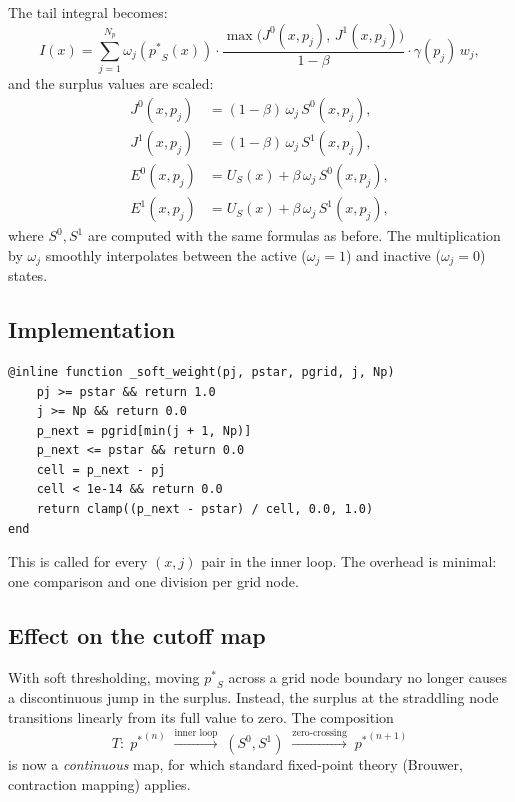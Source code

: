 \documentclass[11pt,a4paper]{article}
\newcommand{\pstar}{\mathord{p^{*}}}
\theoremstyle{definition}
\begin{document}
The tail integral becomes:
\begin{equation}
    I(x) = \sum_{j=1}^{N_p} \omega_j(\pstar_S(x)) \cdot
            \frac{\max\bigl(J^0(x,p_j),\, J^1(x,p_j)\bigr)}{1-\beta}
            \cdot \gamma(p_j)\, w_j,
\end{equation}
and the surplus values are scaled:
\begin{align}
    J^0(x, p_j) &= (1-\beta)\, \omega_j\, S^0(x, p_j), \\
    J^1(x, p_j) &= (1-\beta)\, \omega_j\, S^1(x, p_j), \\
    E^0(x, p_j) &= U_S(x) + \beta\, \omega_j\, S^0(x, p_j), \\
    E^1(x, p_j) &= U_S(x) + \beta\, \omega_j\, S^1(x, p_j),
\end{align}
where $S^0, S^1$ are computed with the same formulas as before.  The
multiplication by $\omega_j$ smoothly interpolates between the active
($\omega_j = 1$) and inactive ($\omega_j = 0$) states.

\subsection{Implementation}

\begin{lstlisting}
@inline function _soft_weight(pj, pstar, pgrid, j, Np)
    pj >= pstar && return 1.0
    j >= Np && return 0.0
    p_next = pgrid[min(j + 1, Np)]
    p_next <= pstar && return 0.0
    cell = p_next - pj
    cell < 1e-14 && return 0.0
    return clamp((p_next - pstar) / cell, 0.0, 1.0)
end
\end{lstlisting}

This is called for every $(x, j)$ pair in the inner loop.  The overhead is
minimal: one comparison and one division per grid node.

\subsection{Effect on the cutoff map}

With soft thresholding, moving $\pstar_S$ across a grid node boundary no
longer causes a discontinuous jump in the surplus.  Instead, the surplus at
the straddling node transitions linearly from its full value to zero.  The
composition
\[
    T:\; \pstar^{(n)}
    \;\xrightarrow{\text{inner loop}}\; (S^0, S^1)
    \;\xrightarrow{\text{zero-crossing}}\; \pstar^{(n+1)}
\]
is now a \emph{continuous} map, for which standard fixed-point theory
(Brouwer, contraction mapping) applies.
\end{document}
